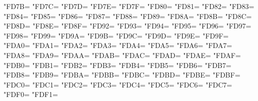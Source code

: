 \XeTeXcharclass"FD7B=\KclassArabU
\XeTeXcharclass"FD7C=\KclassArabU
\XeTeXcharclass"FD7D=\KclassArabU
\XeTeXcharclass"FD7E=\KclassArabU
\XeTeXcharclass"FD7F=\KclassArabU
\XeTeXcharclass"FD80=\KclassArabU
\XeTeXcharclass"FD81=\KclassArabU
\XeTeXcharclass"FD82=\KclassArabU
\XeTeXcharclass"FD83=\KclassArabU
\XeTeXcharclass"FD84=\KclassArabU
\XeTeXcharclass"FD85=\KclassArabU
\XeTeXcharclass"FD86=\KclassArabU
\XeTeXcharclass"FD87=\KclassArabU
\XeTeXcharclass"FD88=\KclassArabU
\XeTeXcharclass"FD89=\KclassArabU
\XeTeXcharclass"FD8A=\KclassArabU
\XeTeXcharclass"FD8B=\KclassArabU
\XeTeXcharclass"FD8C=\KclassArabU
\XeTeXcharclass"FD8D=\KclassArabU
\XeTeXcharclass"FD8E=\KclassArabU
\XeTeXcharclass"FD8F=\KclassArabU
\XeTeXcharclass"FD92=\KclassArabU
\XeTeXcharclass"FD93=\KclassArabU
\XeTeXcharclass"FD94=\KclassArabU
\XeTeXcharclass"FD95=\KclassArabU
\XeTeXcharclass"FD96=\KclassArabU
\XeTeXcharclass"FD97=\KclassArabU
\XeTeXcharclass"FD98=\KclassArabU
\XeTeXcharclass"FD99=\KclassArabU
\XeTeXcharclass"FD9A=\KclassArabU
\XeTeXcharclass"FD9B=\KclassArabU
\XeTeXcharclass"FD9C=\KclassArabU
\XeTeXcharclass"FD9D=\KclassArabU
\XeTeXcharclass"FD9E=\KclassArabU
\XeTeXcharclass"FD9F=\KclassArabU
\XeTeXcharclass"FDA0=\KclassArabU
\XeTeXcharclass"FDA1=\KclassArabU
\XeTeXcharclass"FDA2=\KclassArabU
\XeTeXcharclass"FDA3=\KclassArabU
\XeTeXcharclass"FDA4=\KclassArabU
\XeTeXcharclass"FDA5=\KclassArabU
\XeTeXcharclass"FDA6=\KclassArabU
\XeTeXcharclass"FDA7=\KclassArabU
\XeTeXcharclass"FDA8=\KclassArabU
\XeTeXcharclass"FDA9=\KclassArabU
\XeTeXcharclass"FDAA=\KclassArabU
\XeTeXcharclass"FDAB=\KclassArabU
\XeTeXcharclass"FDAC=\KclassArabU
\XeTeXcharclass"FDAD=\KclassArabU
\XeTeXcharclass"FDAE=\KclassArabU
\XeTeXcharclass"FDAF=\KclassArabU
\XeTeXcharclass"FDB0=\KclassArabU
\XeTeXcharclass"FDB1=\KclassArabU
\XeTeXcharclass"FDB2=\KclassArabU
\XeTeXcharclass"FDB3=\KclassArabU
\XeTeXcharclass"FDB4=\KclassArabU
\XeTeXcharclass"FDB5=\KclassArabU
\XeTeXcharclass"FDB6=\KclassArabU
\XeTeXcharclass"FDB7=\KclassArabU
\XeTeXcharclass"FDB8=\KclassArabU
\XeTeXcharclass"FDB9=\KclassArabU
\XeTeXcharclass"FDBA=\KclassArabU
\XeTeXcharclass"FDBB=\KclassArabU
\XeTeXcharclass"FDBC=\KclassArabU
\XeTeXcharclass"FDBD=\KclassArabU
\XeTeXcharclass"FDBE=\KclassArabU
\XeTeXcharclass"FDBF=\KclassArabU
\XeTeXcharclass"FDC0=\KclassArabU
\XeTeXcharclass"FDC1=\KclassArabU
\XeTeXcharclass"FDC2=\KclassArabU
\XeTeXcharclass"FDC3=\KclassArabU
\XeTeXcharclass"FDC4=\KclassArabU
\XeTeXcharclass"FDC5=\KclassArabU
\XeTeXcharclass"FDC6=\KclassArabU
\XeTeXcharclass"FDC7=\KclassArabU
\XeTeXcharclass"FDF0=\KclassArabU
\XeTeXcharclass"FDF1=\KclassArabU

